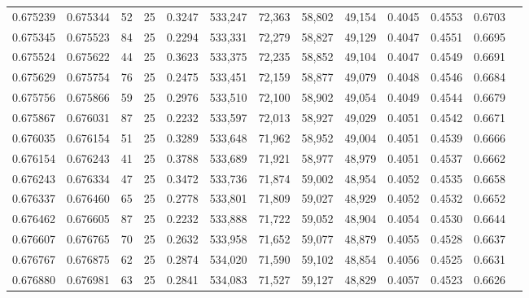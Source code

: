 \begin{tabular}{rrrrrrrrrrrrr}
0.675239 & 0.675344 &    52 &  25 &                                     0.3247 & 533,247 &  72,363 &  58,802 &  49,154 & 0.4045 & 0.4553 & 0.6703 \\
0.675345 & 0.675523 &    84 &  25 &                                     0.2294 & 533,331 &  72,279 &  58,827 &  49,129 & 0.4047 & 0.4551 & 0.6695 \\
0.675524 & 0.675622 &    44 &  25 &                                     0.3623 & 533,375 &  72,235 &  58,852 &  49,104 & 0.4047 & 0.4549 & 0.6691 \\
0.675629 & 0.675754 &    76 &  25 &                                     0.2475 & 533,451 &  72,159 &  58,877 &  49,079 & 0.4048 & 0.4546 & 0.6684 \\
0.675756 & 0.675866 &    59 &  25 &                                     0.2976 & 533,510 &  72,100 &  58,902 &  49,054 & 0.4049 & 0.4544 & 0.6679 \\
0.675867 & 0.676031 &    87 &  25 &                                     0.2232 & 533,597 &  72,013 &  58,927 &  49,029 & 0.4051 & 0.4542 & 0.6671 \\
0.676035 & 0.676154 &    51 &  25 &                                     0.3289 & 533,648 &  71,962 &  58,952 &  49,004 & 0.4051 & 0.4539 & 0.6666 \\
0.676154 & 0.676243 &    41 &  25 &                                     0.3788 & 533,689 &  71,921 &  58,977 &  48,979 & 0.4051 & 0.4537 & 0.6662 \\
0.676243 & 0.676334 &    47 &  25 &                                     0.3472 & 533,736 &  71,874 &  59,002 &  48,954 & 0.4052 & 0.4535 & 0.6658 \\
0.676337 & 0.676460 &    65 &  25 &                                     0.2778 & 533,801 &  71,809 &  59,027 &  48,929 & 0.4052 & 0.4532 & 0.6652 \\
0.676462 & 0.676605 &    87 &  25 &                                     0.2232 & 533,888 &  71,722 &  59,052 &  48,904 & 0.4054 & 0.4530 & 0.6644 \\
0.676607 & 0.676765 &    70 &  25 &                                     0.2632 & 533,958 &  71,652 &  59,077 &  48,879 & 0.4055 & 0.4528 & 0.6637 \\
0.676767 & 0.676875 &    62 &  25 &                                     0.2874 & 534,020 &  71,590 &  59,102 &  48,854 & 0.4056 & 0.4525 & 0.6631 \\
0.676880 & 0.676981 &    63 &  25 &                                     0.2841 & 534,083 &  71,527 &  59,127 &  48,829 & 0.4057 & 0.4523 & 0.6626 \\

\end{tabular}
